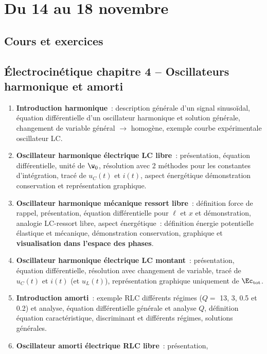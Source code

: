 \documentclass[a4paper, 12pt, final, garamond]{book}
\begin{document}
\setcounter{chapter}{7}

\chapter{Du 14 au 18 novembre}

\section{Cours et exercices}
\section*{Électrocinétique chapitre 4 -- Oscillateurs harmonique et amorti}

\begin{enumerate}[label=\Roman*]
    \item \textbf{Introduction harmonique}~: description générale d'un signal
        sinusoïdal, équation différentielle d'un oscillateur harmonique et
        solution générale, changement de variable général $\rightarrow$
        homogène, exemple courbe expérimentale oscillateur LC.
    \item \textbf{Oscillateur harmonique électrique LC libre}~: présentation,
        équation différentielle, unité de $\w_0$, résolution avec 2 méthodes
        pour les constantes d'intégration, tracé de $u_C(t)$ et $i(t)$, aspect
        énergétique démonstration conservation et représentation graphique.
    \item \textbf{Oscillateur harmonique mécanique ressort libre}~: définition
        force de rappel, présentation, équation différentielle pour $\ell$ et
        $x$ et démonstration, analogie LC-ressort libre, aspect énergétique~:
        définition énergie potentielle élastique et mécanique, démonstration
        conservation, graphique et \textbf{visualisation dans l'espace des
        phases}.
    \item \textbf{Oscillateur harmonique électrique LC montant}~: présentation,
        équation différentielle, résolution avec changement de variable, tracé
        de $u_C(t)$ et $i(t)$ (et $u_L(t)$), représentation graphique uniquement
        de $\Ec_{\rm tot}$.
    \item \textbf{Introduction amorti}~: exemple RLC différents régimes ($Q =$
        13, 3, 0.5 et 0.2) et analyse, équation différentielle générale et
        analyse $Q$, définition équation caractéristique, discriminant et
        différents régimes, solutions générales.
    \item \textbf{Oscillateur amorti électrique RLC libre}~: présentation,

\end{enumerate}
\end{document}
